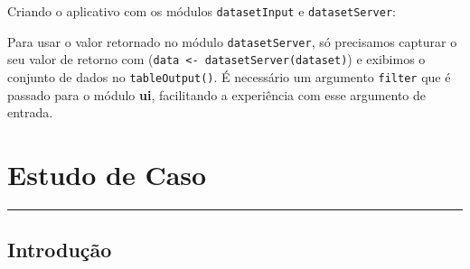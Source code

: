 \documentclass[
]{book}
\newenvironment{Shaded}{\begin{snugshade}}{\end{snugshade}}
\newcommand{\AttributeTok}[1]{\textcolor[rgb]{0.77,0.63,0.00}{#1}}
\newcommand{\ConstantTok}[1]{\textcolor[rgb]{0.00,0.00,0.00}{#1}}
\newcommand{\ControlFlowTok}[1]{\textcolor[rgb]{0.13,0.29,0.53}{\textbf{#1}}}
\newcommand{\FunctionTok}[1]{\textcolor[rgb]{0.00,0.00,0.00}{#1}}
\newcommand{\NormalTok}[1]{#1}
\newcommand{\OtherTok}[1]{\textcolor[rgb]{0.56,0.35,0.01}{#1}}
\newcommand{\SpecialCharTok}[1]{\textcolor[rgb]{0.00,0.00,0.00}{#1}}
\newcommand{\StringTok}[1]{\textcolor[rgb]{0.31,0.60,0.02}{#1}}
\begin{document}
Criando o aplicativo com os módulos \texttt{datasetInput} e \texttt{datasetServer}:

\begin{Shaded}
\end{Shaded}

Para usar o valor retornado no módulo \texttt{datasetServer}, só precisamos capturar o seu valor de retorno com (\texttt{data\ \textless{}-\ datasetServer(\textquotesingle{}dataset\textquotesingle{})}) e exibimos o conjunto de dados no \texttt{tableOutput()}. É necessário um argumento \texttt{filter} que é passado para o módulo \textbf{ui}, facilitando a experiência com esse argumento de entrada.

\hypertarget{estudo-de-caso}{%
\chapter{\texorpdfstring{\textbf{Estudo de Caso}}{Estudo de Caso}}\label{estudo-de-caso}}

\begin{center}\rule{0.5\linewidth}{0.5pt}\end{center}

\hypertarget{introduuxe7uxe3o-3}{%
\section{\texorpdfstring{\textbf{Introdução}}{Introdução}}\label{introduuxe7uxe3o-3}}
\end{document}
